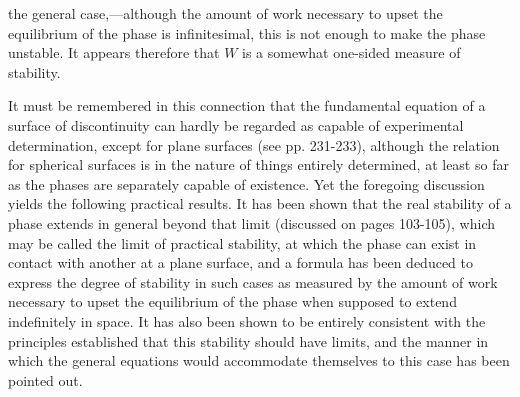 \documentclass[12pt]{article}
\begin{document}
{the general case,---although the amount of work necessary to upset the equilibrium of the phase is infinitesimal, this is not enough to make the phase unstable. It appears therefore that $W$ is a somewhat one-sided measure of stability.

It must be remembered in this connection that the fundamental equation of a surface of discontinuity can hardly be regarded as capable of experimental determination, except for plane surfaces (see pp. 231-233), although the relation for spherical surfaces is in the nature of things entirely determined, at least so far as the phases are separately capable of existence. Yet the foregoing discussion yields the following practical results. It has been shown that the real stability of a phase extends in general beyond that limit (discussed on pages 103-105), which may be called the limit of practical stability, at which the phase can exist in contact with another at a plane surface, and a formula has been deduced to express the degree of stability in such cases as measured by the amount of work necessary to upset the equilibrium of the phase when supposed to extend indefinitely in space. It has also been shown to be entirely consistent with the principles established that this stability should have limits, and the manner in which the general equations would accommodate themselves to this case has been pointed out.

}
\end{document}
